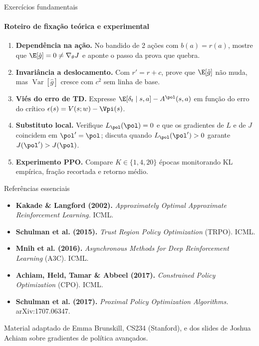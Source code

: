 \documentclass[aspectratio=169, 11pt]{beamer}
\newcommand{\ghat}{\hat{g}}
\newcommand{\Var}{\operatorname{Var}}
\begin{document}
\begin{frame}{Exercícios fundamentais}
  \framesubtitle{Roteiro de fixação teórica e experimental}

  \begin{enumerate}\setlength{\itemsep}{0.45em}
    \item \textbf{Dependência na ação.} No bandido de 2 ações com $b(a) = r(a)$, mostre que
          $\E[\ghat] = 0 \neq \nabla_\theta J$ e aponte o passo da prova que quebra.
    \item \textbf{Invariância a deslocamento.} Com $r' = r + c$, prove que $\E[\ghat]$ não muda,
          mas $\Var[\ghat]$ cresce com $c^2$ sem linha de base.
    \item \textbf{Viés do erro de TD.} Expresse $\E[\delta_t\mid s,a] - A^{\pol}(s,a)$ em função do
          erro do crítico $\epsilon(s) = V(s;w) - \Vpi(s)$.
    \item \textbf{Substituto local.} Verifique $L_{\pol}(\pol) = 0$ e que os gradientes de $L$ e de $J$
          coincidem em $\pol'=\pol$; discuta quando $L_{\pol}(\pol') > 0$ garante $J(\pol') > J(\pol)$.
    \item \textbf{Experimento PPO.} Compare $K\in\{1,4,20\}$ épocas monitorando KL empírica,
          fração recortada e retorno médio.
  \end{enumerate}
\end{frame}

\begin{frame}{Referências essenciais}
  \begin{itemize}\setlength{\itemsep}{0.5em}
    \item \textbf{Kakade \& Langford (2002).} \emph{Approximately Optimal Approximate Reinforcement Learning.} ICML.
    \item \textbf{Schulman et al. (2015).} \emph{Trust Region Policy Optimization} (TRPO). ICML.
    \item \textbf{Mnih et al. (2016).} \emph{Asynchronous Methods for Deep Reinforcement Learning} (A3C). ICML.
    \item \textbf{Achiam, Held, Tamar \& Abbeel (2017).} \emph{Constrained Policy Optimization} (CPO). ICML.
    \item \textbf{Schulman et al. (2017).} \emph{Proximal Policy Optimization Algorithms.} arXiv:1707.06347.
  \end{itemize}

  \vspace{0.8em}
  {\small\color{rlCinza} Material adaptado de Emma Brunskill, CS234 (Stanford), e dos slides de
  Joshua Achiam sobre gradientes de política avançados.}
\end{frame}
\end{document}
